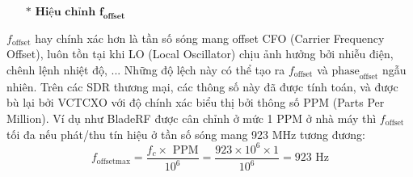 \newpage

\begin{itemize}
	\item[$\ast$] \textbf{$\textbf{Hiệu chỉnh } \textbf{f}_{\textbf{offset}}$}
\end{itemize} 

$f_{\textrm{offset}}$ hay chính xác hơn là tần số sóng mang offset CFO (Carrier Frequency Offset), luôn tồn tại khi LO (Local Oscillator) chịu ảnh hưởng bởi nhiễu điện, chênh lệnh nhiệt độ, ... Những độ lệch này có thể tạo ra $f_{\textrm{offset}}$ và $\textrm{phase}_\textrm{offset}$ ngẫu nhiên. Trên các SDR thương mại, các thông số này đã được tính toán, và được bù lại bởi VCTCXO với độ chính xác biểu thị bởi thông số PPM (Parts Per Million). Ví dụ như BladeRF được cân chỉnh ở mức 1 PPM ở nhà máy thì $f_{\textrm{offset}}$ tối đa nếu phát/thu tín hiệu ở tần số sóng mang 923 MHz tương đương:
\begin{equation}
f_{\mathrm{offset  max}} = \frac{f_c \times\textrm{ PPM}}{10^6} = \frac{923\times 10^6 \times 1}{10^6} = 923 \textrm{ Hz}
\end{equation}


